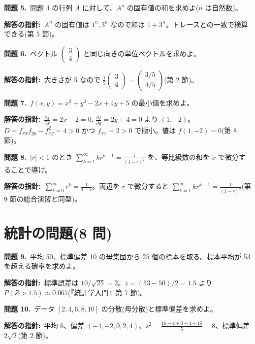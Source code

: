 \documentclass{article}
\begin{document}
\textbf{問題 5.}\ 問題 4 の行列 \(A\) に対して、\(A^n\) の固有値の和を求めよ(\(n\) は自然数)。

\textbf{解答の指針:}\ \(A^n\) の固有値は \(1^n, 3^n\) なので和は \(1 + 3^n\)。トレースとの一致で検算できる(第 5 節)。

\textbf{問題 6.}\ ベクトル \(\begin{pmatrix} 3 \\ 4 \end{pmatrix}\) と同じ向きの単位ベクトルを求めよ。

\textbf{解答の指針:}\ 大きさが 5 なので \(\frac{1}{5}\begin{pmatrix} 3 \\ 4 \end{pmatrix} = \begin{pmatrix} 3/5 \\ 4/5 \end{pmatrix}\)(第 2 節)。

\textbf{問題 7.}\ \(f(x, y) = x^2 + y^2 - 2x + 4y + 5\) の最小値を求めよ。

\textbf{解答の指針:}\ \(\frac{\partial f}{\partial x} = 2x - 2 = 0\), \(\frac{\partial f}{\partial y} = 2y + 4 = 0\) より \((1, -2)\)。\(D = f_{xx}f_{yy} - f_{xy}^2 = 4 > 0\) かつ \(f_{xx} = 2 > 0\) で極小。値は \(f(1, -2) = 0\)(第 8 節)。

\textbf{問題 8.}\ \(|r| < 1\) のとき \(\displaystyle \sum_{k=1}^{\infty} k r^{k-1} = \frac{1}{(1-r)^2}\) を、等比級数の和を \(x\) で微分することで導け。

\textbf{解答の指針:}\ \(\sum_{k=0}^\infty r^k = \frac{1}{1-r}\)。両辺を \(r\) で微分すると \(\sum_{k=1}^\infty k r^{k-1} = \frac{1}{(1-r)^2}\)(第 9 節の総合演習と同型)。

\section{統計の問題(8 問)}

\textbf{問題 9.}\ 平均 50、標準偏差 10 の母集団から 25 個の標本を取る。標本平均が 53 を超える確率を求めよ。

\textbf{解答の指針:}\ 標準誤差は \(10/\sqrt{25} = 2\)。\(z = (53 - 50)/2 = 1.5\) より \(P(Z > 1.5) \approx 0.067\)(『統計学入門』第 7 節)。

\textbf{問題 10.}\ データ \([2, 4, 6, 8, 10]\) の分散(母分散)と標準偏差を求めよ。

\textbf{解答の指針:}\ 平均 6、偏差 \((-4, -2, 0, 2, 4)\)、\(s^2 = \frac{16 + 4 + 0 + 4 + 16}{5} = 8\)、標準偏差 \(2\sqrt{2}\)(第 2 節)。
\end{document}
